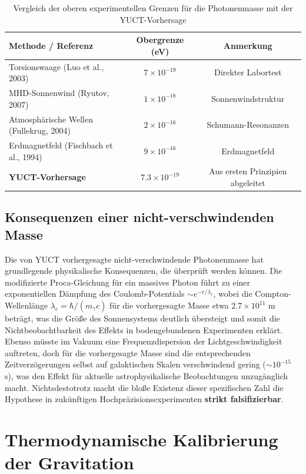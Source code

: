 \documentclass[11pt,a4paper]{article}
\begin{document}
	\begin{table}[h!]
		\centering
		\caption{Vergleich der oberen experimentellen Grenzen für die Photonenmasse mit der YUCT-Vorhersage}
		\label{tab:photon_limits}
		\small
		\begin{tabular}{lcc}
			\toprule
			\textbf{Methode / Referenz} & \textbf{Obergrenze (eV)} & \textbf{Anmerkung} \\
			\midrule
			Torsionswaage (Luo et al., 2003) & $7\times10^{-19}$ & Direkter Labortest \\
			MHD-Sonnenwind (Ryutov, 2007) & $1\times10^{-18}$ & Sonnenwindstruktur \\
			Atmosphärische Wellen (Fullekrug, 2004) & $2\times10^{-16}$ & Schumann-Resonanzen \\
			Erdmagnetfeld (Fischbach et al., 1994) & $9\times10^{-16}$ & Erdmagnetfeld \\
			\midrule
			\textbf{YUCT-Vorhersage} & \textbf{$7.3\times10^{-19}$} & Aus ersten Prinzipien abgeleitet \\
			\bottomrule
		\end{tabular}
	\end{table}
	
	\subsection{Konsequenzen einer nicht-verschwindenden Masse}
	Die von YUCT vorhergesagte nicht-verschwindende Photonenmasse hat grundlegende physikalische Konsequenzen, die überprüft werden können. Die modifizierte Proca-Gleichung für ein massives Photon \cite{Proca1936} führt zu einer exponentiellen Dämpfung des Coulomb-Potentials $\sim e^{-r/\lambda_c}$, wobei die Compton-Wellenlänge $\lambda_c = \hbar / (m_\gamma c)$ für die vorhergesagte Masse etwa $2.7 \times 10^{11}$ m beträgt, was die Größe des Sonnensystems deutlich übersteigt und somit die Nichtbeobachtbarkeit des Effekts in bodengebundenen Experimenten erklärt. Ebenso müsste im Vakuum eine Frequenzdispersion der Lichtgeschwindigkeit auftreten, doch für die vorhergesagte Masse sind die entsprechenden Zeitverzögerungen selbst auf galaktischen Skalen verschwindend gering ($\sim 10^{-15}$ s), was den Effekt für aktuelle astrophysikalische Beobachtungen unzugänglich macht. Nichtsdestotrotz macht die bloße Existenz dieser spezifischen Zahl die Hypothese in zukünftigen Hochpräzisionsexperimenten \textbf{strikt falsifizierbar}.
	
	\section{Thermodynamische Kalibrierung der Gravitation}
	\label{sec:thermal_gravity}
	
\end{document}
